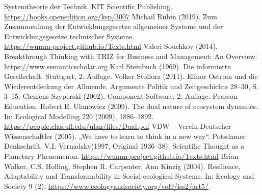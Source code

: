 \documentclass[11pt,a4paper]{article}
\begin{document}
\begin{thebibliography}{xxx}
  Systemtheorie der Technik.  KIT Scientific Publishing.
  \url{https://books.openedition.org/ksp/3007}
 Michail Rubin (2019).  Zum Zusammenhang der
  Entwicklungsgesetze allgemeiner Systeme und der Entwicklungsgesetze
  technischer Systeme. \\ \url{https://wumm-project.github.io/Texts.html}
 Valeri Souchkov (2014). Breakthrough Thinking with TRIZ
  for Business and Management: An Overview.
  \url{https://www.semanticscholar.org}
 Karl Steinbuch (1969). Die informierte Gesellschaft.
  Stuttgart, 2. Auflage.
 Volker Stollorz (2011). Elinor Ostrom und die
  Wiederentdeckung der Allmende. Argumente Politik und Zeitgeschichte 28--30,
  S. 3--15.
 Clemens Szyperski (2002). Component Software.
  2. Auf\-lage.  Pearson Education.
 Robert E. Ulanowicz (2009). The dual nature of
  ecosystem dynamics.  In: Ecological Modelling 220 (2009),
  1886–1892.\\ \url{https://people.clas.ufl.edu/ulan/files/Dual.pdf}
 VDW -- Verein Deutscher Wissenschaftler (2005). „We have to
  learn to think in a new way“. Potsdamer Denkschrift.
 V.I. Vernadsky(1997, Original 1936--38). Scientific
  Thought as a Planetary Phenomenon.
  \url{https://wumm-project.github.io/Texts.html}
 Brian Walker, C.S. Holling, Stephen R. Carpenter, Ann
  Kinzig (2004).  Resilience, Adaptability and Transformability in
  Social-ecological Systems.  In: Ecology and Society 9 (2).
  \url{https://www.ecologyandsociety.org/vol9/iss2/art5/}
\end{thebibliography}
\end{document}
